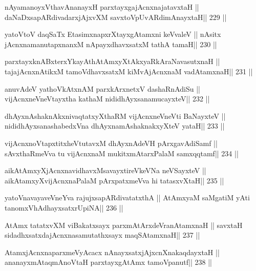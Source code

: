 \begin{shl}
nAyamanoyxV\s thavA\s nanayxH parxtayxgajAcnxnajatavxtaH ||
daNaDxsapARdivadarxjAjxvXM savxtoV\s pUvARdimAnayxtaH\hfill || 229 ||
\end{shl}

\begin{shl}
yatoV\s toV daqSaTx EtasimxnapxrXtayxgAtamxni keVvaleV ||
nAsitx jAcnxnamanutapxnanxM nApayxdhavxsatxM tathA tamaH\hfill || 230 ||
\end{shl}

\begin{shl}
parxtayxknABxterxYkayAthAtAmxyXtAkxyaRkAraNavasutxnaH ||
tajajAcnxnAtikxM tamoV\s dhavxsatxM kiMvA\s jAcnxnaM vadA\s\s tamxnaH\hfill || 231 ||
\end{shl}

\begin{shl}
anuvAdeV yathoVkAtxnAM parxkArxnetxV dashaRnAdiSu ||
vijAcnxneVneVtayxtha kathaM nididhAyxsanamucayxteV\hfill || 232 ||
\end{shl}

\begin{shl}
dhAyxnAshaknAkxnivaqtatxyXthaRM vijAcnxneVneVti BaNayxteV ||
nididhAyxsanashabedxVna dhAyxnamAshaknakxyXteV yataH\hfill || 233 ||
\end{shl}

\begin{shl}
vijAcnxnoVtapxtitxheVtutavxM dhAyxnAdeVH pArxgavAdiSamf ||
sAvxthaRmeVva tu vijAcnxnaM mukitxmAtarxPalaM samxqqtamf\hfill || 234 ||
\end{shl}

\begin{shl}
aikAtAmxyXjAcnxnavidhavxMsavayxtireVkeVNa neVSayxteV ||
aikAtamxyXvijAcnxnaPalaM pArxpatxmeVva hi tatasxvXtaH\hfill || 235 ||
\end{shl}

\begin{shl}
yatoV\s navayaveVneYva rajujxsapARdivatatxthA ||
AtAmx\s yaM saMgatiM yAti tanomxVhAdhayxsatxrUpiNA\hfill || 236 ||
\end{shl}

\begin{shl}
AtAmx tatatxvXM viBakatxsayx parxmAtArxdeVranAtamxnaH ||
savxtaH sidadhxsatxdajAcnxnasamutathxsayx maqSAtamxnaH\hfill || 237 ||
\end{shl}

\begin{shl}
AtamxjAcnxnaparxmeVyAcacx nAnayxsatxjAjxcnXnakaqdayxtaH ||
ananayxmAtaqmAnoV\s taH parxtayxgAtAmx tamoVpanutf\hfill || 238 ||
\end{shl}

